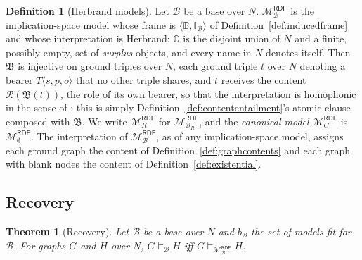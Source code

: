 \documentclass[12pt]{article}
\newcommand{\B}{\mathbb{B}}   %
\newcommand{\I}{\mathbb{I}}
\newtheorem{theorem}{Theorem}
\theoremstyle{definition}
\newtheorem{definition}{Definition}
\newcommand{\tuple}[1]{\langle #1 \rangle}
\newcommand{\Obb}{\mathbb{O}}   %
\newcommand{\bmap}{\mathfrak{B}}  %
\newcommand{\role}{\mathcal{R}}   %
\newcommand{\Mcal}{\mathcal{M}}   %
\newcommand{\Bcal}{\mathcal{B}}   %
\begin{document}
\begin{definition}[Herbrand models]
\label{def:canonicalmodel}
Let $\Bcal$ be a base over $N$. $\Mcal_{\Bcal}^{\mathsf{RDF}}$ is the implication-space model whose frame is $\tuple{\B, \I_{\Bcal}}$ of Definition~\ref{def:inducedframe} and whose interpretation is Herbrand: $\Obb$ is the disjoint union of $N$ and a finite, possibly empty, set of \textit{surplus} objects, and every name in $N$ denotes itself. Then $\bmap$ is injective on ground triples over $N$, each ground triple $t$ over $N$ denoting a bearer $T\tuple{s,p,o}$ that no other triple shares, and $t$ receives the content $\role(\bmap(t))$, the role of its own bearer, so that the interpretation is homophonic in the sense of \citet[Def.~72]{hlobil2025reasons}; this is simply Definition~\ref{def:contententailment}'s atomic clause composed with $\bmap$. We write $\Mcal_{R}^{\mathsf{RDF}}$ for $\Mcal_{\Bcal_R}^{\mathsf{RDF}}$, and the \textit{canonical model} $\Mcal_{C}^{\mathsf{RDF}}$ is $\Mcal_{\emptyset}^{\mathsf{RDF}}$. The interpretation of $\Mcal_{\Bcal}^{\mathsf{RDF}}$, as of any implication-space model, assigns each ground graph the content of Definition~\ref{def:graphcontents} and each graph with blank nodes the content of Definition~\ref{def:existential}.
\end{definition}

\subsection{Recovery}
\label{sec:recovery}

\begin{theorem}[Recovery]
\label{thm:recovery}
Let $\Bcal$ be a base over $N$ and $b_{\Bcal}$ the set of models fit for $\Bcal$. For graphs $G$ and $H$ over $N$, $G \models_{\Bcal} H$ iff $G \models_{\Mcal_{\Bcal}^{\mathsf{RDF}}} H$.
\end{theorem}
\end{document}

